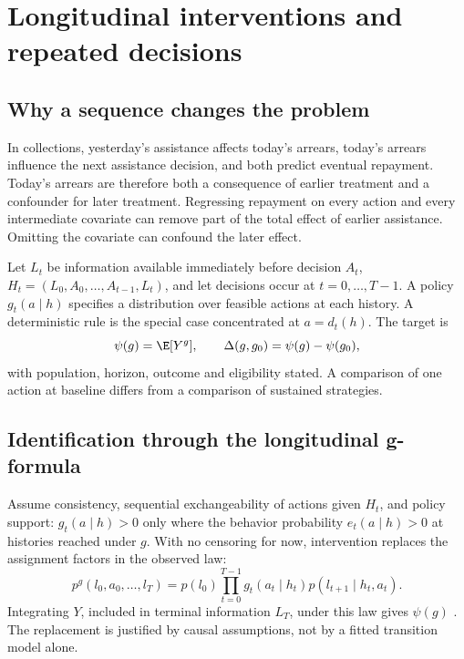 \chapter{Longitudinal interventions and repeated decisions}\label{ch:longitudinal}
\section{Why a sequence changes the problem}
In collections, yesterday's assistance affects today's arrears, today's arrears
influence the next assistance decision, and both predict eventual repayment.
Today's arrears are therefore both a consequence of earlier treatment and
a confounder for later treatment. Regressing repayment on every action and
every intermediate covariate can remove part of the total effect of earlier
assistance. Omitting the covariate can confound the later effect.

Let $L_t$ be information available immediately before decision $A_t$,
$H_t=(L_0,A_0,\ldots,A_{t-1},L_t)$, and let decisions occur at
$t=0,\ldots,T-1$. A policy $g_t(a\mid h)$ specifies a distribution over
feasible actions at each history. A deterministic rule is the special case
concentrated at $a=d_t(h)$. The target is
\begin{equation}
 \psi(g)=\E[Y^g],\qquad \Delta(g,g_0)=\psi(g)-\psi(g_0),
 \label{eq:policytarget}
\end{equation}
with population, horizon, outcome and eligibility stated. A comparison of
one action at baseline differs from a comparison of sustained strategies.

\section{Identification through the longitudinal g-formula}
Assume consistency, sequential exchangeability of actions given $H_t$,
and policy support: $g_t(a\mid h)>0$ only where the behavior probability
$e_t(a\mid h)>0$ at histories reached under $g$.
With no censoring for now, intervention replaces the assignment factors
in the observed law:
\begin{equation}
 p^g(l_0,a_0,\ldots,l_T)
 =p(l_0)\prod_{t=0}^{T-1}
   g_t(a_t\mid h_t)p(l_{t+1}\mid h_t,a_t).
 \label{eq:gformula}
\end{equation}
Integrating $Y$, included in terminal information $L_T$, under this law
gives $\psi(g)$ \citep{hernan2020}. The replacement is justified by causal
assumptions, not by a fitted transition model alone.

